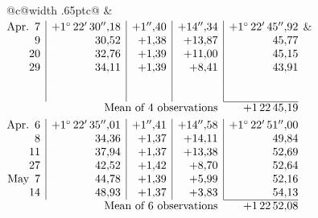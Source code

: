 \noindent\begin{tabular}{@{}c@{\hspace{.4em}\vrule width .65pt\hspace{.4em}}c@{}}
 &
 \\[.18ex]
\(\begin{array}[t]{@{}r|r|r|r|r@{}}
\text{Apr.}\enspace 7 & +1^\circ\,22'\,30''{,}18 & +1''{,}40 & +14''{,}34 & +1^\circ\,22'\,45''{,}92\\
9 & 30{,}52 & +1{,}38 & +13{,}87 & 45{,}77\\
20 & 32{,}76 & +1{,}39 & +11{,}00 & 45{,}15\\
29 & 34{,}11 & +1{,}39 & +8{,}41 & 43{,}91\\
 & & & & \\
 & & & & \\
\cline{5-5}
\multicolumn{4}{r}{\text{Mean of 4 observations}} & +1\,22\,45{,}19
\end{array}\)
&
\(\begin{array}[t]{@{}r|r|r|r|r@{}}
\text{Apr.}\enspace 6 & +1^\circ\,22'\,35''{,}01 & +1''{,}41 & +14''{,}58 & +1^\circ\,22'\,51''{,}00\\
8 & 34{,}36 & +1{,}37 & +14{,}11 & 49{,}84\\
11 & 37{,}94 & +1{,}37 & +13{,}38 & 52{,}69\\
27 & 42{,}52 & +1{,}42 & +8{,}70 & 52{,}64\\
\text{May}\enspace 7 & 44{,}78 & +1{,}39 & +5{,}99 & 52{,}16\\
14 & 48{,}93 & +1{,}37 & +3{,}83 & 54{,}13\\
\cline{5-5}
\multicolumn{4}{r}{\text{Mean of 6 observations}} & +1\,22\,52{,}08
\end{array}\)
\end{tabular}\par\medskip
